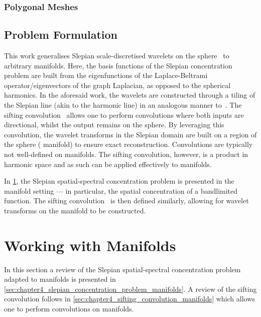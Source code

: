 \subsubsection{Polygonal Meshes}



\subsection{Problem Formulation}\label{sec:chapter4_problem_formulation}

This work generalises Slepian scale-discretised wavelets on the sphere~\cite{Roddy2021a} to arbitrary manifolds.
Here, the basis functions of the Slepian concentration problem are built from the eigenfunctions of the Laplace-Beltrami operator/eigenvectors of the graph Laplacian, as opposed to the spherical harmonics.
In the aforesaid work, the wavelets are constructed through a tiling of the Slepian line (akin to the harmonic line) in an analogous manner to~\cite{Wiaux2008,McEwen2018}.
The sifting convolution~\cite{Roddy2021} allows one to perform convolutions where both inputs are directional, whilst the output remains on the sphere.
By leveraging this convolution, the wavelet transforms in the Slepian domain are built on a region of the sphere (\cf{} manifold) to ensure exact reconstruction.
Convolutions are typically not well-defined on manifolds.
The sifting convolution, however, is a product in harmonic space and as such can be applied effectively to manifolds.

In \cref{sec:chapter4_working_with_manifolds}, the Slepian spatial-spectral concentration problem is presented in the manifold setting --- in particular, the spatial concentration of a bandlimited function.
The sifting convolution~\cite{Roddy2021} is then defined similarly, allowing for wavelet transforms on the manifold to be constructed.

\section{Working with Manifolds}\label{sec:chapter4_working_with_manifolds}

In this section a review of the Slepian spatial-spectral concentration problem adapted to manifolds is presented in \cref{sec:chapter4_slepian_concentration_problem_manifolds}.
A review of the sifting convolution follows in \cref{sec:chapter4_sifting_convolution_manifolds} which allows one to perform convolutions on manifolds.

